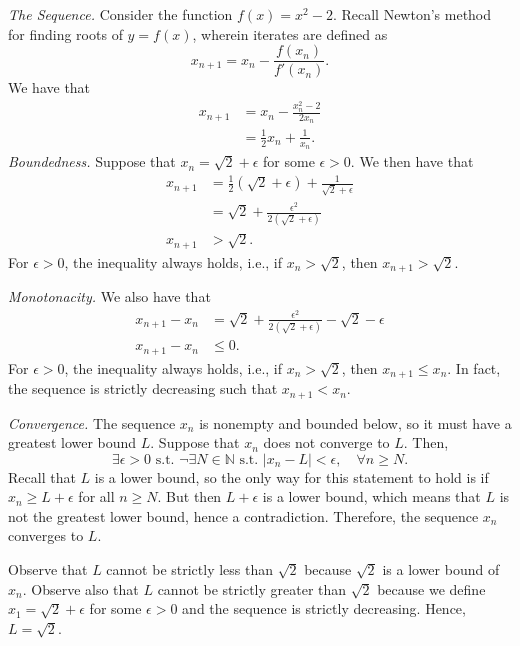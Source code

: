 \documentclass[titlepage]{article}
\begin{document}
\textit{The Sequence.} Consider the function $f(x) = x^{2} - 2$. Recall Newton's method for finding roots of $y = f(x)$, wherein iterates are defined as 
$$x_{n+1} = x_{n} - \frac{f(x_{n})}{f'(x_{n})}.$$
We have that 
\begin{align*}
    x_{n+1} &= x_{n} - \frac{x_{n}^{2} - 2}{2x_{n}} \\
            &= \frac{1}{2}x_{n} + \frac{1}{x_{n}}.
\end{align*}
\textit{Boundedness.} Suppose that $x_{n} = \sqrt{2} + \epsilon$ for some $\epsilon > 0$. We then have that 
\begin{align*}
    x_{n+1} &= \frac{1}{2}(\sqrt{2} + \epsilon) + \frac{1}{\sqrt{2} + \epsilon} \\
            &= \sqrt{2} + \frac{\epsilon^{2}}{2(\sqrt{2} + \epsilon)} \\
    x_{n+1} &> \sqrt{2}.
\end{align*}
For $\epsilon > 0$,  the inequality always holds, i.e., if $x_{n} > \sqrt{2}$, then $x_{n+1} > \sqrt{2}$. 

\textit{Monotonacity.} We also have that 
\begin{align*}
    x_{n+1} - x_{n} &= \sqrt{2} +  \frac{\epsilon^{2}}{2(\sqrt{2} + \epsilon)} - \sqrt{2} - \epsilon \\
    x_{n+1} - x_{n} &\leq 0.
\end{align*}
For $\epsilon > 0$, the inequality always holds, i.e., if $x_{n} > \sqrt{2}$, then $x_{n+1} \leq x_{n}$. In fact, the sequence is strictly decreasing such that $x_{n+1} < x_{n}$.

\textit{Convergence.} The sequence $x_{n}$ is nonempty and bounded below, so it must have a greatest lower bound $L$. Suppose that $x_{n}$ does not converge to $L$. Then, 
$$\exists\epsilon>0 \text{ s.t. } \neg\exists N \in \mathbb{N} \text{ s.t. } |x_{n}-L|<\epsilon, \quad \forall n \geq N.$$
Recall that $L$ is a lower bound, so the only way for this statement to hold is if 
$x_{n} \geq L + \epsilon$ for all $n \geq N$. But then $L + \epsilon$ is a lower bound, which means that $L$ is not the 
greatest lower bound, hence a contradiction. Therefore, the sequence $x_{n}$ converges to $L$. 

Observe that $L$ cannot be strictly less than $\sqrt{2}$ because $\sqrt{2}$ is a lower bound of $x_{n}$. Observe also that $L$ cannot be strictly greater than $\sqrt{2}$ because we define $x_{1} = \sqrt{2} + \epsilon$ for some $\epsilon > 0$ and the sequence is strictly decreasing. Hence, $L = \sqrt{2}$.
\end{document}
